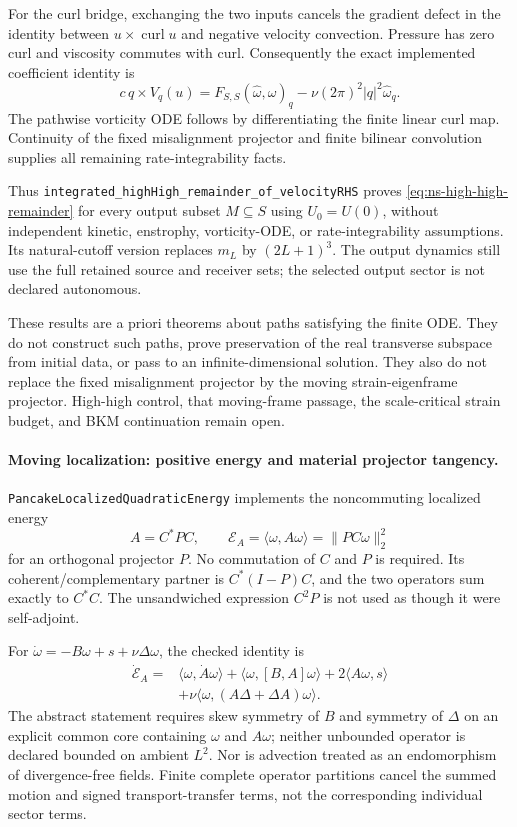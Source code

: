\documentclass[11pt]{article}
\theoremstyle{definition}
\begin{document}
For the curl bridge, exchanging the two inputs cancels the gradient defect
in the identity between $u\times\operatorname{curl}u$ and negative velocity
convection.  Pressure has zero curl and viscosity commutes with curl.
Consequently the exact implemented coefficient identity is
\[
 c\,q\times V_q(u)
   =F_{S,S}(\widehat\omega,\widehat\omega)_q
      -\nu(2\pi)^2|q|^2\widehat\omega_q.
\]
The pathwise vorticity ODE follows by differentiating the finite linear curl
map.  Continuity of the fixed misalignment projector and finite bilinear
convolution supplies all remaining rate-integrability facts.

Thus \texttt{integrated\_highHigh\_remainder\_of\_velocityRHS} proves
\eqref{eq:ns-high-high-remainder} for every output subset $M\subseteq S$
using $U_0=U(0)$, without independent kinetic, enstrophy, vorticity-ODE,
or rate-integrability assumptions.  Its natural-cutoff version replaces
$m_L$ by $(2L+1)^3$.  The output dynamics still use the full retained
source and receiver sets; the selected output sector is not declared
autonomous.

These results are a priori theorems about paths satisfying the finite ODE.
They do not construct such paths, prove preservation of the real transverse
subspace from initial data, or pass to an infinite-dimensional solution.
They also do not replace the fixed misalignment projector by the moving
strain-eigenframe projector.  High-high control, that moving-frame passage,
the scale-critical strain budget, and BKM continuation remain open.

\paragraph{Moving localization: positive energy and material projector tangency.}
\texttt{PancakeLocalizedQuadraticEnergy} implements the noncommuting
localized energy
\[
 A=C^*PC,\qquad \mathcal E_A=\langle\omega,A\omega\rangle
       =\|PC\omega\|_2^2
\]
for an orthogonal projector $P$.  No commutation of $C$ and $P$ is
required.  Its coherent/complementary partner is $C^*(I-P)C$, and the
two operators sum exactly to $C^*C$.  The unsandwiched expression
$C^2P$ is not used as though it were self-adjoint.

For $\dot\omega=-B\omega+s+\nu\Delta\omega$, the checked identity is
\begin{align*}
 \dot{\mathcal E}_A
  ={}&\langle\omega,\dot A\omega\rangle
      +\langle\omega,[B,A]\omega\rangle
      +2\langle A\omega,s\rangle\\
    &+\nu\langle\omega,(A\Delta+\Delta A)\omega\rangle.
\end{align*}
The abstract statement requires skew symmetry of $B$ and symmetry of
$\Delta$ on an explicit common core containing $\omega$ and $A\omega$;
neither unbounded operator is declared bounded on ambient $L^2$.
Nor is advection treated as an endomorphism of divergence-free fields.
Finite complete operator partitions cancel the summed motion and signed
transport-transfer terms, not the corresponding individual sector terms.
\end{document}
